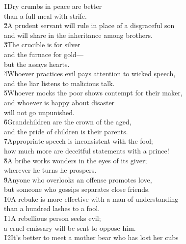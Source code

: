 \begin{poetry}
\poeml {}
\v{1}Dry crumbs in peace are better \\
\poeml than a full meal with strife. \\
\poeml \v{2}A prudent servant will rule in place of a disgraceful son \\
\poemll    and will share in the inheritance among brothers. \\
\poeml \v{3}The crucible is for silver \\
\poemll    and the furnace for gold--- \\
\poemlll       but the  assays hearts. \\
\poeml \v{4}Whoever practices evil pays attention to wicked speech, \\
\poemll    and the liar listens to malicious talk. \\
\poeml \v{5}Whoever mocks the poor shows contempt for their maker, \\
\poemll    and whoever is happy about disaster \\
\poemlll       will not go unpunished. \\
\poeml \v{6}Grandchildren are the crown of the aged, \\
\poemll    and the pride of children is their parents. \\
\poeml \v{7}Appropriate speech is inconsistent with the fool; \\
\poemll    how much more are deceitful statements with a prince! \\
\poeml \v{8}A bribe works wonders in the eyes of its giver; \\
\poemll    wherever he turns he prospers. \\
\poeml \v{9}Anyone who overlooks an offense promotes love, \\
\poemll    but someone who gossips separates close friends. \\
\poeml \v{10}A rebuke is more effective with a man of understanding \\
\poemll    than a hundred lashes to a fool. \\
\poeml \v{11}A rebellious person seeks evil; \\
\poemll    a cruel emissary will be sent to oppose him. \\
\poeml \v{12}It's better to meet a mother bear who has lost her cubs \\

\end{poetry}
